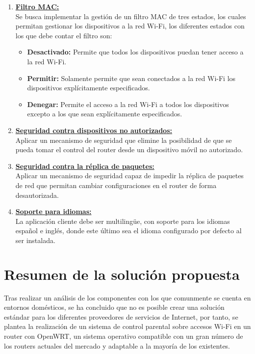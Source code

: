 \documentclass[12pt]{article}
\begin{document}
\begin{enumerate}
        \item \textbf{\underline{Filtro MAC:}} \\
            Se busca implementar la gestión de un filtro MAC de tres estados, los cuales permitan gestionar los dispositivos a la red Wi-Fi, los diferentes estados con los que debe contar el filtro son:
            \begin{itemize}
                \item \textbf{Desactivado:} Permite que todos los dispositivos puedan tener acceso a la red Wi-Fi.
                \item \textbf{Permitir:} Solamente permite que sean conectados a la red Wi-Fi los dispositivos explícitamente especificados. 
                \item \textbf{Denegar:} Permite el acceso a la red Wi-Fi a todos los dispositivos excepto a los que sean explícitamente especificados.
            \end{itemize}
        \item \textbf{\underline{Seguridad contra dispositivos no autorizados:}} \\
            Aplicar un mecanismo de seguridad que elimine la posibilidad de que se pueda tomar el control del router desde un dispositivo móvil no autorizado.
        \item \textbf{\underline{Seguridad contra la réplica de paquetes:}} \\
            Aplicar un mecanismo de seguridad capaz de impedir la réplica de paquetes de red que permitan cambiar configuraciones en el router de forma desautorizada.
        \item \textbf{\underline{Soporte para idiomas:}} \\
            La aplicación cliente debe ser multilingüe, con soporte para los idiomas español e inglés, donde este último sea el idioma configurado por defecto al ser instalada.
    \end{enumerate}


\section{Resumen de la solución propuesta}
    Tras realizar un análisis de los componentes con los que comunmente se cuenta en entornos domésticos, se ha concluido que no es posible crear una solución estándar para los diferentes proveedores de servicios de Internet, por tanto, se plantea la realización de un sistema de control parental sobre accesos Wi-Fi en un router con OpenWRT, un sistema operativo compatible con un gran número de los routers actuales del mercado y adaptable a la mayoría de los existentes. 
    
\end{document}
